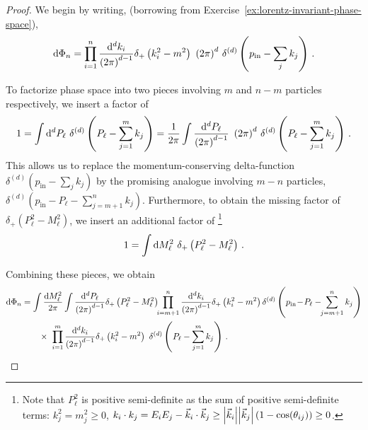 \begin{proof}
    We begin by writing, (borrowing from Exercise~\ref{ex:lorentz-invariant-phase-space}),
    \begin{align}
        \dd \Phi_n
        =
        \prod_{i=1}^n
        \frac{\dd^d k_i}{\left(2\pi\right)^{d-1}}
        \delta_+\left(k_i^2 - m^2\right)
        \,\,
        \left(2\pi\right)^d
        \,
        \delta^{(d)}\left(p_\text{in} - \sum_j k_j\right)
        \,.
    \end{align}

    To factorize phase space into two pieces involving \(m\) and \(n-m\) particles respectively, we insert a factor of
    \begin{align}
        1 = \int \dd^d P_\ell
        \,\,
        \delta^{(d)}\left(P_\ell - \sum_{j=1}^m k_j\right)
        =
        \frac{1}{2\pi}
        \int \frac{\dd^d P_\ell}{\left(2\pi\right)^{d-1}}
        \,\,
        \left(2 \pi\right)^d
        \,
        \delta^{(d)}\left(P_\ell - \sum_{j=1}^m k_j\right)
        \,.
    \end{align}
    This allows us to replace the momentum-conserving delta-function \(\delta^{(d)}(p_\text{in} - \sum_j k_j)\) by the promising analogue involving \(m-n\) particles, \(\delta^{(d)}(p_\text{in} - P_\ell - \sum_{j=m+1}^n k_j)\).
    Furthermore, to obtain the missing factor of \(\delta_+(P_\ell^2 - M_\ell^2)\), we insert an additional factor of%
    \footnote{
        Note that \(P_\ell^2\) is positive semi-definite as the sum of positive semi-definite terms:
        \(k_j^2 = m_j^2 \geq 0\), \(k_i \cdot k_j = E_i E_j - \vec{k}_i\cdot \vec{k}_j \geq \abs{\vec{k}_i}\abs{\vec{k}_j}\left(1 - \cos(\theta_{ij})\right) \geq 0\).
    }
    \begin{align}
        1 = \int \dd M^2_\ell
        \,\,
        \delta_+\left(P_\ell^2 - M_\ell^2\right)
        \,.
    \end{align}

    Combining these pieces, we obtain
    \begin{align}
        \dd \Phi_n
        &=
        \int \frac{\dd M_\ell^2}{2\pi}
        \int
        \frac{\dd^d P_\ell}{\left(2\pi\right)^{d-1}}
        \delta_+\left(P_\ell^2 - M_\ell^2\right)
        \!\!
        \prod_{i=m+1}^n
        \frac{\dd^d k_i}{\left(2\pi\right)^{d-1}}
        \delta_+\left(k_i^2 - m^2\right)
        \delta^{(d)}
        \left(p_\text{in} \! -\! P_\ell - \!\! \sum_{j=m+1}^n k_j\right)
        \notag
        \\
        &
        \qquad
        \times
        \,\,
        \prod_{i=1}^m
        \frac{\dd^d k_i}{\left(2\pi\right)^{d-1}}
        \delta_+\left(k_i^2 - m^2\right)
        \,\,
        \delta^{(d)}\left(P_\ell - \sum_{j=1}^m k_j\right)
        \,.
    \end{align}
\end{proof}


